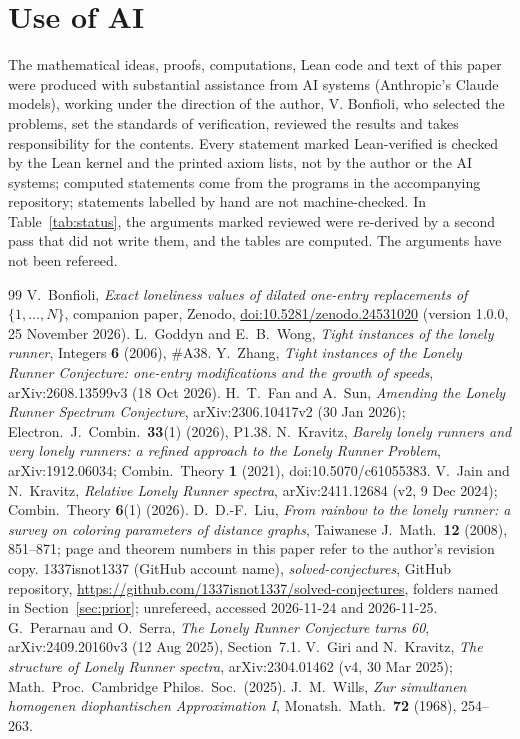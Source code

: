 \documentclass[11pt]{article}
\theoremstyle{definition}
\theoremstyle{remark}
\begin{document}
\section*{Use of AI}
The mathematical ideas, proofs, computations, Lean code and text of this paper were produced with substantial assistance from AI systems (Anthropic's Claude models), working under the direction of the author, V. Bonfioli, who selected the problems, set the standards of verification, reviewed the results and takes responsibility for the contents. Every statement marked Lean-verified is checked by the Lean kernel and the printed axiom lists, not by the author or the AI systems; computed statements come from the programs in the accompanying repository; statements labelled by hand are not machine-checked. In Table~\ref{tab:status}, the arguments marked reviewed were re-derived by a second pass that did not write them, and the tables are computed. The arguments have not been refereed.

\begin{thebibliography}{99}
 V.~Bonfioli, \emph{Exact loneliness values of dilated one-entry replacements of $\{1,\dots,N\}$}, companion paper, Zenodo, \href{https://doi.org/10.5281/zenodo.24531020}{doi:10.5281/zenodo.24531020} (version 1.0.0, 25 November 2026).
 L.~Goddyn and E.~B.~Wong, \emph{Tight instances of the lonely runner}, Integers \textbf{6} (2006), \#A38.
 Y.~Zhang, \emph{Tight instances of the Lonely Runner Conjecture: one-entry modifications and the growth of speeds}, arXiv:2608.13599v3 (18 Oct 2026).
 H.~T.~Fan and A.~Sun, \emph{Amending the Lonely Runner Spectrum Conjecture}, arXiv:2306.10417v2 (30 Jan 2026); Electron.\ J.\ Combin.\ \textbf{33}(1) (2026), P1.38.
 N.~Kravitz, \emph{Barely lonely runners and very lonely runners: a refined approach to the Lonely Runner Problem}, arXiv:1912.06034; Combin.\ Theory \textbf{1} (2021), doi:10.5070/c61055383.
 V.~Jain and N.~Kravitz, \emph{Relative Lonely Runner spectra}, arXiv:2411.12684 (v2, 9 Dec 2024); Combin.\ Theory \textbf{6}(1) (2026).
 D.~D.-F.~Liu, \emph{From rainbow to the lonely runner: a survey on coloring parameters of distance graphs}, Taiwanese J.\ Math.\ \textbf{12} (2008), 851--871; page and theorem numbers in this paper refer to the author's revision copy.
 1337isnot1337 (GitHub account name), \emph{solved-conjectures}, GitHub repository, \url{https://github.com/1337isnot1337/solved-conjectures}, folders named in Section~\ref{sec:prior}; unrefereed, accessed 2026-11-24 and 2026-11-25.
 G.~Perarnau and O.~Serra, \emph{The Lonely Runner Conjecture turns 60}, arXiv:2409.20160v3 (12 Aug 2025), Section~7.1.
 V.~Giri and N.~Kravitz, \emph{The structure of Lonely Runner spectra}, arXiv:2304.01462 (v4, 30 Mar 2025); Math.\ Proc.\ Cambridge Philos.\ Soc.\ (2025).
 J.~M.~Wills, \emph{Zur simultanen homogenen diophantischen Approximation I}, Monatsh.\ Math.\ \textbf{72} (1968), 254--263.
\end{thebibliography}
\end{document}

